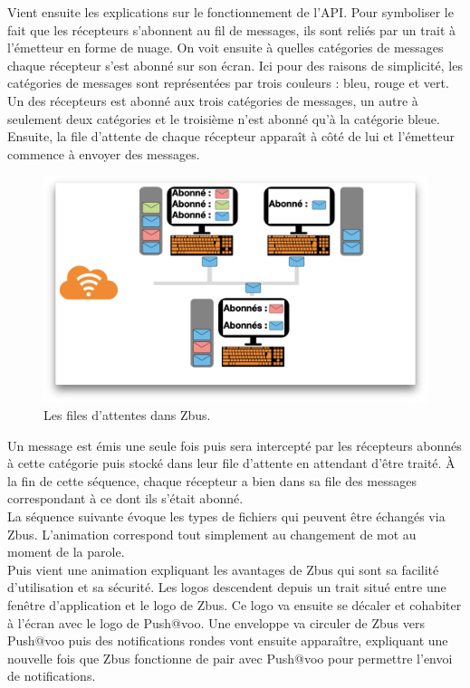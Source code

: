 Vient ensuite les explications sur le fonctionnement de l'API. Pour symboliser le fait que les récepteurs s'abonnent au fil de messages, ils sont reliés par un trait à l'émetteur en forme de nuage. On voit ensuite à quelles catégories de messages chaque récepteur s'est abonné sur son écran. Ici pour des raisons de simplicité, les catégories de messages sont représentées par trois couleurs : bleu, rouge et vert. Un des récepteurs est abonné aux trois catégories de messages, un autre à seulement deux catégories et le troisième n'est abonné qu'à la catégorie bleue. Ensuite, la file d'attente de chaque récepteur apparaît à côté de lui et l'émetteur commence à envoyer des messages. 


\begin{figure}[htp]
  \centering
  \includegraphics[width=15cm]{images/zbus/screensbus.png}
  \caption{Les files d'attentes dans Zbus.}
  \label{screenzbus}
\end{figure}


Un message est émis une seule fois puis sera intercepté par les récepteurs abonnés à cette catégorie puis stocké dans leur file d'attente en attendant d'être traité. À la fin de cette séquence, chaque récepteur a bien dans sa file des messages correspondant à ce dont ils s'était abonné.\\

La séquence suivante évoque les types de fichiers qui peuvent être échangés via Zbus. L'animation correspond tout simplement au changement de mot au moment de la parole.\\

Puis vient une animation expliquant les avantages de Zbus qui sont sa facilité d'utilisation et sa sécurité. Les logos descendent depuis un trait situé entre une fenêtre d'application et le logo de Zbus. Ce logo va ensuite se décaler et cohabiter à l'écran avec le logo de Push@voo. Une enveloppe va circuler de Zbus vers Push@voo puis des notifications rondes vont ensuite apparaître, expliquant une nouvelle fois que Zbus fonctionne de pair avec Push@voo pour permettre l'envoi de notifications.\\

